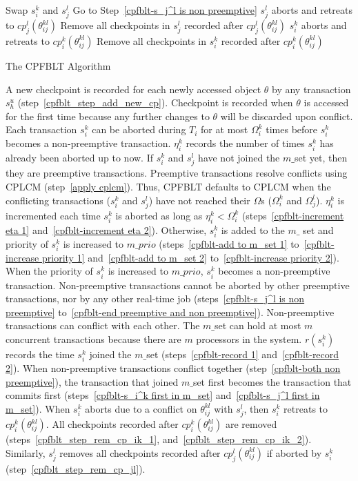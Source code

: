 \begin{algorithm}
{{{}
}
{
Swap $s_{i}^k$ and $s_{j}^l$\;
Go to Step~\ref{cpfblt-s_j^l is non preemptive}\label{cpfblt-end preemptive and non preemptive}\;
}
\Else
{
\label{cpfblt-both non preemptive}
{	
$s_{j}^l$ aborts and retreats to $cp_j^l(\theta_{ij}^{kl})$\label{cpfblt-s_i^k first in m_set}\;
Remove all checkpoints in $s_j^l$ recorded after $cp_j^l(\theta_{ij}^{kl})$\label{cpfblt_step_rem_cp_jl}\;
}
{
$s_{i}^k$ aborts and retreats to $cp_i^k(\theta_{ij}^{kl})$\label{cpfblt-s_j^l first in m_set}\;
Remove all checkpoints in $s_i^k$ recorded after $cp_i^k(\theta_{ij}^{kl})$\label{cpfblt_step_rem_cp_ik_2}\;
}
}
}
\caption{The CPFBLT Algorithm}\label{cpfblt-algorithm}
\end{algorithm}
%
A new checkpoint is recorded for each newly accessed object $\theta$ by any transaction $s_h^u$ (step~\ref{cpfblt_step_add_new_cp}). Checkpoint is recorded when $\theta$ is accessed for the first time because any further changes to $\theta$ will be discarded upon conflict. Each transaction $s_{i}^{k}$ can be aborted during $T_i$ for at most $\Omega_{i}^{k}$ times before $s_i^k$ becomes a non-preemptive transaction. $\eta_{i}^{k}$ records  the number of times $s_{i}^{k}$ has already been aborted up to now. If $s_i^k$ and $s_j^l$ have not joined the $m\_$set yet, then they are preemptive transactions. Preemptive transactions resolve conflicts using CPLCM (step~\ref{apply cplcm}). Thus, CPFBLT defaults to CPLCM when the conflicting transactions ($s_i^k$ and $s_j^l$) have not reached their $\Omega$s ($\Omega_i^k$ and $\Omega_j^l$). $\eta_i^k$ is incremented each time $s_{i}^k$ is aborted as long as $\eta_i^k < \Omega_i^k$ (steps~\ref{cpfblt-increment eta 1} and~\ref{cpfblt-increment eta 2}). Otherwise, $s_i^k$ is added to the $m\_$ set and priority of $s_{i}^k$ is increased to $m\_prio$ (steps~\ref{cpfblt-add to m_set 1} to~\ref{cpfblt-increase priority 1} and~\ref{cpfblt-add to m_set 2} to~\ref{cpfblt-increase priority 2}). When the priority of $s_i^k$ is increased to $m\_prio$, $s_i^k$ becomes a non-preemptive transaction. Non-preemptive transactions cannot be aborted by other preemptive transactions, nor by any other real-time job (steps~\ref{cpfblt-s_j^l is non preemptive} to~\ref{cpfblt-end preemptive and non preemptive}). Non-preemptive transactions can conflict with each other. The $m\_$set can hold at most $m$ concurrent transactions because there are $m$ processors in the system. $r(s_i^k)$ records the time $s_i^k$ joined the $m\_$set (steps~\ref{cpfblt-record 1} and~\ref{cpfblt-record 2}). When non-preemptive transactions conflict together (step~\ref{cpfblt-both non preemptive}), the transaction that joined $m\_$set first becomes the transaction that commits first (steps~\ref{cpfblt-s_i^k first in m_set} and~\ref{cpfblt-s_j^l first in m_set}). When $s_i^k$ aborts due to a conflict on $\theta_{ij}^{kl}$ with $s_j^l$, then $s_i^k$ retreats to $cp_i^k(\theta_{ij}^{kl})$. All checkpoints recorded after $cp_i^k(\theta_{ij}^{kl})$ are removed (steps~\ref{cpfblt_step_rem_cp_ik_1}, and~\ref{cpfblt_step_rem_cp_ik_2}). Similarly, $s_j^l$ removes all checkpoints recorded after $cp_j^l(\theta_{ij}^{kl})$ if aborted by $s_i^k$ (step~\ref{cpfblt_step_rem_cp_jl}).

